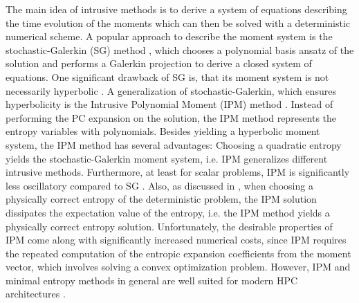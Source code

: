 The main idea of intrusive methods is to derive a system of equations describing the time evolution of the moments which can then be solved with a deterministic numerical scheme. A popular approach to describe the moment system is the stochastic-Galerkin (SG) method \cite{ghanem2003stochastic}, which chooses a polynomial basis ansatz of the solution and performs a Galerkin projection to derive a closed system of equations. One significant drawback of SG is, that its moment system is not necessarily hyperbolic \cite{poette2009uncertainty}. A generalization of stochastic-Galerkin, which ensures hyperbolicity is the Intrusive Polynomial Moment (IPM) method \cite{poette2009uncertainty}. Instead of performing the PC expansion on the solution, the IPM method represents the entropy variables with polynomials. Besides yielding a hyperbolic moment system, the IPM method has several advantages: Choosing a quadratic entropy yields the stochastic-Galerkin moment system, i.e. IPM generalizes different intrusive methods. Furthermore, at least for scalar problems, IPM is significantly less oscillatory compared to SG \cite{kusch2017maximum}. Also, as discussed in \cite{poette2009uncertainty}, when choosing a physically correct entropy of the deterministic problem, the IPM solution dissipates the expectation value of the entropy, i.e. the IPM method yields a physically correct entropy solution. Unfortunately, the desirable properties of IPM come along with significantly increased numerical costs, since IPM requires the repeated computation of the entropic expansion coefficients from the moment vector, which involves solving a convex optimization problem. However, IPM and minimal entropy methods in general are well suited for modern HPC architectures \cite{garrett2015optimization}. 

